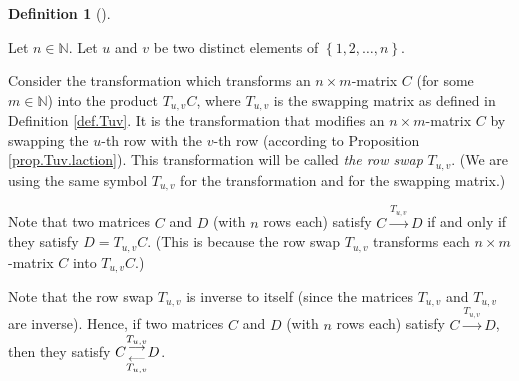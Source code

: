 \documentclass[numbers=enddot,12pt,final,onecolumn,notitlepage]{scrartcl}%
\theoremstyle{definition}
\newtheorem{defi}[theo]{Definition}
\newenvironment{definition}[1][]
{\begin{defi}[#1]\begin{leftbar}}
{\end{leftbar}\end{defi}}
\begin{document}
\begin{definition}
\label{def.row-ops.row-swap}Let $n\in\mathbb{N}$. Let $u$ and $v$ be two
distinct elements of $\left\{  1,2,\ldots,n\right\}  $.

Consider the transformation which transforms an $n\times m$-matrix $C$ (for
some $m\in\mathbb{N}$) into the product $T_{u,v}C$, where $T_{u,v}$ is the
swapping matrix as defined in Definition \ref{def.Tuv}. It is the
transformation that modifies an $n\times m$-matrix $C$ by swapping the $u$-th
row with the $v$-th row (according to Proposition \ref{prop.Tuv.laction}).
This transformation will be called \textit{the row swap }$T_{u,v}$. (We are
using the same symbol $T_{u,v}$ for the transformation and for the swapping matrix.)

Note that two matrices $C$ and $D$ (with $n$ rows each) satisfy
$C\overset{T_{u,v}}{\longrightarrow}D$ if and only if they satisfy
$D=T_{u,v}C$. (This is because the row swap $T_{u,v}$ transforms each $n\times
m$-matrix $C$ into $T_{u,v}C$.)

Note that the row swap $T_{u,v}$ is inverse to itself (since the matrices
$T_{u,v}$ and $T_{u,v}$ are inverse). Hence, if two matrices $C$ and $D$ (with
$n$ rows each) satisfy $C\overset{T_{u,v}}{\longrightarrow}D$, then they
satisfy $C\underset{T_{u,v}}{\overset{T_{u,v}}{%
\genfrac{}{}{0pt}{1}{\longrightarrow}{\longleftarrow}%
}}D$.
\end{definition}
\end{document}
